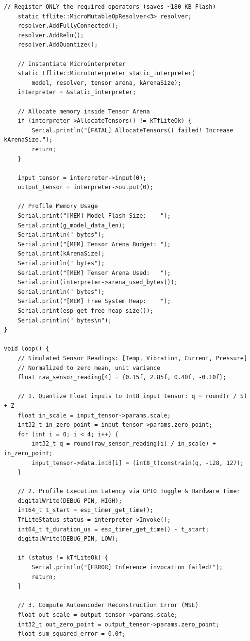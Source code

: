 \begin{lstlisting}[style=pythonstyle, caption={Complete production-grade ESP32 TinyML anomaly detector with profiling.}, label={lst:complete_esp32_sketch}]
    // Register ONLY the required operators (saves ~180 KB Flash)
    static tflite::MicroMutableOpResolver<3> resolver;
    resolver.AddFullyConnected();
    resolver.AddRelu();
    resolver.AddQuantize();

    // Instantiate MicroInterpreter
    static tflite::MicroInterpreter static_interpreter(
        model, resolver, tensor_arena, kArenaSize);
    interpreter = &static_interpreter;

    // Allocate memory inside Tensor Arena
    if (interpreter->AllocateTensors() != kTfLiteOk) {
        Serial.println("[FATAL] AllocateTensors() failed! Increase kArenaSize.");
        return;
    }

    input_tensor = interpreter->input(0);
    output_tensor = interpreter->output(0);

    // Profile Memory Usage
    Serial.print("[MEM] Model Flash Size:    ");
    Serial.print(g_model_data_len);
    Serial.println(" bytes");
    Serial.print("[MEM] Tensor Arena Budget: ");
    Serial.print(kArenaSize);
    Serial.println(" bytes");
    Serial.print("[MEM] Tensor Arena Used:   ");
    Serial.print(interpreter->arena_used_bytes());
    Serial.println(" bytes");
    Serial.print("[MEM] Free System Heap:    ");
    Serial.print(esp_get_free_heap_size());
    Serial.println(" bytes\n");
}

void loop() {
    // Simulated Sensor Readings: [Temp, Vibration, Current, Pressure]
    // Normalized to zero mean, unit variance
    float raw_sensor_reading[4] = {0.15f, 2.85f, 0.40f, -0.10f};

    // 1. Quantize Float inputs to Int8 input tensor: q = round(r / S) + Z
    float in_scale = input_tensor->params.scale;
    int32_t in_zero_point = input_tensor->params.zero_point;
    for (int i = 0; i < 4; i++) {
        int32_t q = round(raw_sensor_reading[i] / in_scale) + in_zero_point;
        input_tensor->data.int8[i] = (int8_t)constrain(q, -128, 127);
    }

    // 2. Profile Execution Latency via GPIO Toggle & Hardware Timer
    digitalWrite(DEBUG_PIN, HIGH);
    int64_t t_start = esp_timer_get_time();
    TfLiteStatus status = interpreter->Invoke();
    int64_t t_duration_us = esp_timer_get_time() - t_start;
    digitalWrite(DEBUG_PIN, LOW);

    if (status != kTfLiteOk) {
        Serial.println("[ERROR] Inference invocation failed!");
        return;
    }

    // 3. Compute Autoencoder Reconstruction Error (MSE)
    float out_scale = output_tensor->params.scale;
    int32_t out_zero_point = output_tensor->params.zero_point;
    float sum_squared_error = 0.0f;


\end{lstlisting}
